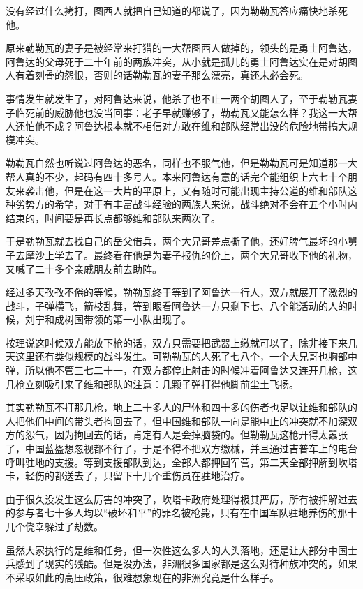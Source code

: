 没有经过什么拷打，图西人就把自己知道的都说了，因为勒勒瓦答应痛快地杀死他。

原来勒勒瓦的妻子是被经常来打猎的一大帮图西人做掉的，领头的是勇士阿鲁达，阿鲁达的父母死于二十年前的两族冲突，从小就是孤儿的勇士阿鲁达实在是对胡图人有着刻骨的怨恨，否则的话勒勒瓦的妻子那么漂亮，真还未必会死。

事情发生就发生了，对阿鲁达来说，他杀了也不止一两个胡图人了，至于勒勒瓦妻子临死前的威胁他也没当回事：老子早就赚够了，勒勒瓦又能怎么样？我这一大帮人还怕他不成？阿鲁达根本就不相信对方敢在维和部队经常出没的危险地带搞大规模冲突。

勒勒瓦自然也听说过阿鲁达的恶名，同样也不服气他，但是勒勒瓦可是知道那一大帮人真的不少，起码有四十多号人。本来阿鲁达有意的话完全能组织上六七十个朋友来袭击他，但是在这一大片的平原上，又有随时可能出现主持公道的维和部队这种劣势方的希望，对于有丰富战斗经验的两族人来说，战斗绝对不会在五个小时内结束的，时间要是再长点都够维和部队来两次了。

于是勒勒瓦就去找自己的岳父借兵，两个大兄哥差点撕了他，还好脾气最坏的小舅子去摩沙上学去了。最终看在他是为妻子报仇的份上，两个大兄哥收下他的礼物，又喊了二十多个亲戚朋友前去助阵。

经过多天孜孜不倦的等候，勒勒瓦终于等到了阿鲁达一行人，双方就展开了激烈的战斗，子弹横飞，箭枝乱舞，等到眼看阿鲁达一方只剩下七、八个能活动的人的时候，刘宁和成树国带领的第一小队出现了。

按理说这时候双方能放下枪的话，双方只需要把武器上缴就可以了，除非接下来几天这里还有类似规模的战斗发生。可勒勒瓦的人死了七八个，一个大兄哥也胸部中弹，所以他不管三七二十一，在双方都停止射击的时候冲着阿鲁达又连开几枪，这几枪立刻吸引来了维和部队的注意：几颗子弹打得他脚前尘土飞扬。

其实勒勒瓦不打那几枪，地上二十多人的尸体和四十多的伤者也足以让维和部队的人把他们中间的带头者拘回去了，但中国维和部队一向是能中止的冲突就不加深双方的怨气，因为拘回去的话，肯定有人是会掉脑袋的。但勒勒瓦这枪开得太嚣张了，中国蓝盔想忽视都不行了，于是不得不把双方缴械，并且通过吉普车上的电台呼叫驻地的支援。等到支援部队到达，全部人都押回军营，第二天全部押解到坎塔卡，轻伤的都送去了，只留下十几个重伤员在驻地治疗。

由于很久没发生这么厉害的冲突了，坎塔卡政府处理得极其严厉，所有被押解过去的参与者七十多人均以“破坏和平”的罪名被枪毙，只有在中国军队驻地养伤的那十几个侥幸躲过了劫数。

虽然大家执行的是维和任务，但一次性这么多人的人头落地，还是让大部分中国士兵感到了现实的残酷。但是没办法，非洲很多国家都是这么对待种族冲突的，如果不采取如此的高压政策，很难想象现在的非洲究竟是什么样子。

